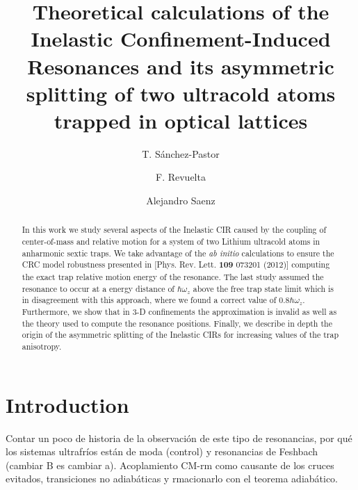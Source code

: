 \documentclass[aps,pre,twocolumn,superscriptaddress,showpacs]{revtex4-1}
\newcommand{\abinitio}{\textit{ab initio }}
\begin{document}
\title{Theoretical calculations of the Inelastic Confinement-Induced Resonances and its asymmetric splitting of two ultracold atoms trapped in optical lattices}
%
\author{T. S\'anchez-Pastor}

\author{F. Revuelta}

\author{Alejandro Saenz}
%
\begin{abstract}
	In this work we study several aspects of the Inelastic CIR caused by the coupling of center-of-mass and relative motion for a system of two Lithium 		ultracold atoms in anharmonic sextic traps. We take advantage of the \abinitio calculations to ensure the CRC model robustness presented in [Phys. 	Rev. Lett. \textbf{109} 073201 (2012)] computing the exact trap relative motion energy of the resonance. The last study assumed the resonance to occur 	at a energy distance of $\hbar \omega_z$ above the free trap state limit which is in disagreement with this approach, where we found a correct value of 	$0.8\hbar \omega_z$. Furthermore, we show that in 3-D confinements the approximation is invalid as well as the theory used to compute the 		resonance positions. Finally, we describe in depth the origin of the asymmetric splitting of the Inelastic CIRs for increasing values of the trap anisotropy.
\end{abstract}

\maketitle

\section{Introduction}  \label{sec:intro}
	Contar un poco de historia de la observación de este tipo de resonancias, por qué los sistemas ultrafríos están de moda (control) y resonancias de 		Feshbach (cambiar B es cambiar a). Acoplamiento CM-rm como causante de los cruces evitados, transiciones no adiabáticas y rmacionarlo con el 		teorema adiabático.
\end{document}
